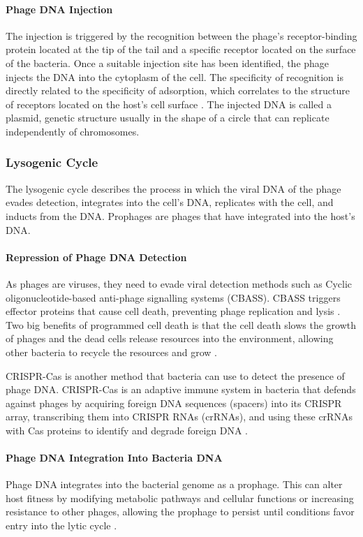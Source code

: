 \paragraph{Phage DNA Injection}
The injection is triggered by the recognition between the phage's receptor-binding protein located at the tip of the tail and a specific receptor located on the surface of the bacteria. 
Once a suitable injection site has been identified, the phage injects the DNA into the cytoplasm of the cell. 
The specificity of recognition is directly related to the specificity of adsorption, which correlates to the structure of receptors located on the host's cell surface \cite{stoneUnderstandingExploitingPhage2019}. 
The injected DNA is called a plasmid, genetic structure usually in the shape of a circle that can replicate independently of chromosomes. 

\subsubsection{Lysogenic Cycle}
The lysogenic cycle describes the process in which the viral DNA of the phage evades detection, integrates into the cell's DNA, replicates with the cell, and inducts from the DNA. 
Prophages are phages that have integrated into the host's DNA. 

\paragraph{Repression of Phage DNA Detection}
As phages are viruses, they need to evade viral detection methods such as Cyclic oligonucleotide-based anti-phage signalling systems (CBASS). 
CBASS triggers effector proteins that cause cell death, preventing phage replication and lysis \cite{banhBacterialCGASSenses2023}. 
Two big benefits of programmed cell death is that the cell death slows the growth of phages and the dead cells release resources into the environment, allowing other bacteria to recycle the resources and grow \cite{warwick-dugdaleHosthijackingPlanktonicPiracy2019}. 

CRISPR-Cas is another method that bacteria can use to detect the presence of phage DNA. 
CRISPR-Cas is an adaptive immune system in bacteria that defends against phages by acquiring foreign DNA sequences (spacers) into its CRISPR array, transcribing them into CRISPR RNAs (crRNAs), and using these crRNAs with Cas proteins to identify and degrade foreign DNA \cite{levyCRISPRAdaptationBiases2015}. 


\paragraph{Phage DNA Integration Into Bacteria DNA}
Phage DNA integrates into the bacterial genome as a prophage. 
This can alter host fitness by modifying metabolic pathways and cellular functions or increasing resistance to other phages, allowing the prophage to persist until conditions favor entry into the lytic cycle \cite{warwick-dugdaleHosthijackingPlanktonicPiracy2019}.

